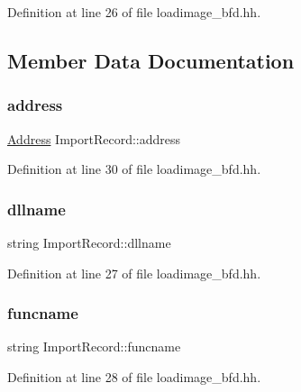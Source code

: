 Definition at line 26 of file loadimage\+\_\+bfd.\+hh.



\subsection{Member Data Documentation}
\mbox{\label{struct_import_record_a03818a5259182c955eb6518abfaf39f1}} 
\subsubsection{\texorpdfstring{address}{address}}
{\footnotesize\ttfamily \mbox{\hyperlink{class_address}{Address}} Import\+Record\+::address}



Definition at line 30 of file loadimage\+\_\+bfd.\+hh.

\mbox{\label{struct_import_record_a04ec6c4186ebf93830c2c74803a653c4}} 
\subsubsection{\texorpdfstring{dllname}{dllname}}
{\footnotesize\ttfamily string Import\+Record\+::dllname}



Definition at line 27 of file loadimage\+\_\+bfd.\+hh.

\mbox{\label{struct_import_record_a988b2e50b452326a4a16c7faeba7d776}} 
\subsubsection{\texorpdfstring{funcname}{funcname}}
{\footnotesize\ttfamily string Import\+Record\+::funcname}



Definition at line 28 of file loadimage\+\_\+bfd.\+hh.

\mbox{\label{struct_import_record_ae1f918072fed4d48a3140b08ebf18a9e}} 
